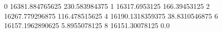 0 16381.884765625 230.583984375
1 16317.6953125 166.39453125
2 16267.779296875 116.478515625
4 16190.1318359375 38.8310546875
6 16157.1962890625 5.8955078125
8 16151.30078125 0.0
